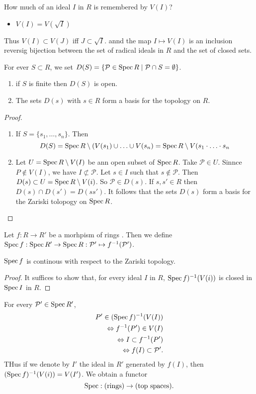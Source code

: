 How much of an ideal $I$ in $R$ is remembered by $V(I)$?
\begin{itemize}
	\item $V(I) = V(\sqrt{I} )$
\end{itemize}
Thus $V(I) \subset V(J)$ iff $J \subset \sqrt{I} $.
annd the map $I \mapsto V(I)$ is an inclusion reversig bijection between the set of radical ideals in $R$ and the set of closed sets. 

For ever $S \subset R$, we set $D(S) = \{ \mathcal{P}  \in \operatorname{Spec} R \;|\; \mathcal{P} \cap S = \emptyset\} $.

\begin{proposition}
	\begin{enumerate}
		\item if $S$ is finite then $D(S)$ is open.
		\item The sets $D(s)$ with $s \in R$ form a basis for the topology on $R$.
	\end{enumerate}
\end{proposition}
\begin{proof}
\begin{enumerate}
	\item If $S = \{s_1, \ldots, s_n\} $.  Then \[
			D(S) = \operatorname{Spec} R \setminus (V(s_1) \cup \ldots \cup V(s_n)
			= \operatorname{Spec} R \setminus V(s_1 \cdot \ldots \cdot s_n
		\]
	\item Let $U = \operatorname{Spec} R \setminus V(I)$ be ann open subset of $\operatorname{Spec} R$. Take $\mathcal{P}  \in U$. 
		Sinnce $P \not\in  V(I)$, we have $I \not \subset \mathcal{P} $. 
		Let $s \in I$ such that $s \not\in \mathcal{P} $.
		Then $D(s) \subset U = \operatorname{Spec} R \setminus V(i)$.  So $\mathcal{P}  \in D(s)$.
If $s, s' \in R$ then $D(s) \cap D(s') = D(ss')$. 
It follows that the sets $D(s)$ form a basis for the Zariski tolopogy on $\operatorname{Spec} R$. 
\end{enumerate}
\end{proof}


Let $f: R \to R'$ be a morhpism of rings . 
Then we define $\operatorname{Spec} f: \operatorname{Spec} R' \to \operatorname{Spec} R : \mathcal{P} ' \mapsto f^{-1}(\mathcal{P} ')$. 
\begin{proposition}
	$\operatorname{Spec} f$ is continous with respect to the Zariski topology.
\end{proposition}
\begin{proof}
	It suffices to show that, for every ideal $I $ in $R$, $\operatorname{Spec} f)^{-1}(V(i))$ is closed in $\operatorname{Spec} I $ in $R$. 
\end{proof}
For every $\mathcal{P} ' \in \operatorname{Spec} R'$, 
\begin{align*}
	P' \in (\operatorname{Spec} f)^{-1} (V(I))\\
	\Leftrightarrow f^{-1}(P') \in V(I) \\
	\Leftrightarrow I \subset f^{-1}(P') \\
	\Leftrightarrow f(I) \subset \mathcal{P} '
.\end{align*}
THus if we denote by  $I'$ the ideal in $R'$ generated by $f(I)$, then $(\operatorname{Spec} f)^{-1} (V(i)) = V(I')$. 
We obtain a functor
\[
	\operatorname{Spec}: (\text{rings}) \to (\text{top spaces})
.\] 
